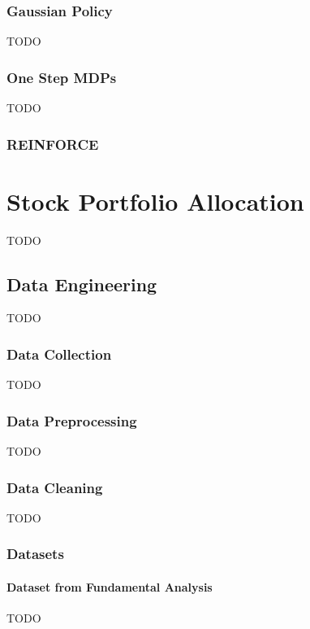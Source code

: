 \subsection{Gaussian Policy}\label{subsec:gaussian-policy}
TODO

\subsection{One Step MDPs}\label{subsec:one-step-mdps}
TODO

\subsection{REINFORCE}\label{subsec:reinforce}




\chapter{Stock Portfolio Allocation}\label{sec:implementation}
TODO


\section{Data Engineering}\label{ch:data-engineering}
TODO

\subsection{Data Collection}\label{sec:data-collection}
TODO

\subsection{Data Preprocessing}\label{sec:data-preprocessing}
TODO

\subsection{Data Cleaning}\label{subsec:data-cleaning}
TODO

\subsection{Datasets}\label{sec:final-datasets}

\subsubsection{Dataset from Fundamental Analysis}\label{sec:fundamental-analysis}
TODO

